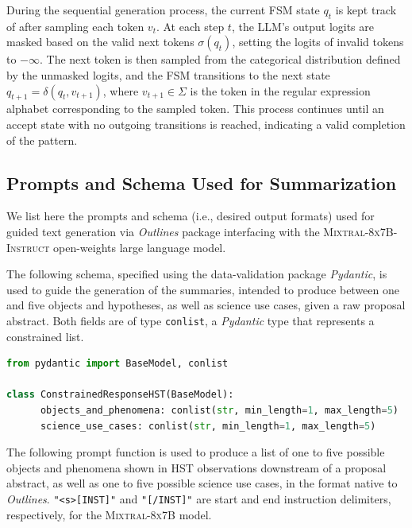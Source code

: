 \documentclass{article} %
\newcommand{\package}[1]{\textsl{#1}\xspace}
\begin{document}
During the sequential generation process, the current FSM state $q_t$ is kept track of after sampling each token $v_t$. At each step $t$, the LLM's output logits are masked based on the valid next tokens $\sigma(q_t)$, setting the logits of invalid tokens to $-\infty$. The next token is then sampled from the categorical distribution defined by the unmasked logits, and the FSM transitions to the next state $q_{t+1} = \delta(q_t, v_{t+1})$, where $v_{t+1} \in \Sigma$ is the token in the regular expression alphabet corresponding to the sampled token. This process continues until an accept state with no outgoing transitions is reached, indicating a valid completion of the pattern.

\subsection{Prompts and Schema Used for Summarization}
\label{app:summarization}

We list here the prompts and schema (i.e., desired output formats) used for guided text generation via \package{Outlines} package interfacing with the \textsc{Mixtral-8x7B-Instruct} open-weights large language model.

The following schema, specified using the data-validation package \package{Pydantic}, is used to guide the generation of the summaries, intended to produce between one and five objects and hypotheses, as well as science use cases, given a raw proposal abstract. Both fields are of type \texttt{conlist}, a \package{Pydantic} type that represents a constrained list.  \\

\begin{lstlisting}[language=Python]
from pydantic import BaseModel, conlist

class ConstrainedResponseHST(BaseModel):
      objects_and_phenomena: conlist(str, min_length=1, max_length=5)
      science_use_cases: conlist(str, min_length=1, max_length=5)
\end{lstlisting}

The following prompt function is used to produce a list of one to five possible objects and phenomena shown in HST observations downstream of a proposal abstract, as well as one to five possible science use cases, in the format native to \package{Outlines}. \textcolor{deepgreen}{\lstinline{"<s>[INST]"}} and \textcolor{deepgreen}{\lstinline{"[/INST]"}} are start and end instruction delimiters, respectively, for the \textsc{Mixtral-8x7B} model.\\
\end{document}
